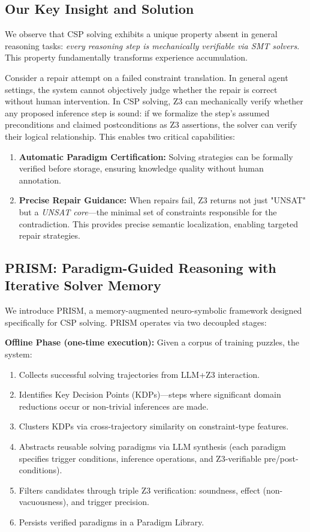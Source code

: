 \subsection{Our Key Insight and Solution}

We observe that CSP solving exhibits a unique property absent in general reasoning tasks: \textit{every reasoning step is mechanically verifiable via SMT solvers}. This property fundamentally transforms experience accumulation.

Consider a repair attempt on a failed constraint translation. In general agent settings, the system cannot objectively judge whether the repair is correct without human intervention. In CSP solving, Z3 can mechanically verify whether any proposed inference step is sound: if we formalize the step's assumed preconditions and claimed postconditions as Z3 assertions, the solver can verify their logical relationship. This enables two critical capabilities:

\begin{enumerate}
    \item \textbf{Automatic Paradigm Certification:} Solving strategies can be formally verified before storage, ensuring knowledge quality without human annotation.
    \item \textbf{Precise Repair Guidance:} When repairs fail, Z3 returns not just "UNSAT" but a \textit{UNSAT core}—the minimal set of constraints responsible for the contradiction. This provides precise semantic localization, enabling targeted repair strategies.
\end{enumerate}

\subsection{PRISM: Paradigm-Guided Reasoning with Iterative Solver Memory}

We introduce PRISM, a memory-augmented neuro-symbolic framework designed specifically for CSP solving. PRISM operates via two decoupled stages:

\textbf{Offline Phase (one-time execution):} Given a corpus of training puzzles, the system:
\begin{enumerate}
    \item Collects successful solving trajectories from LLM+Z3 interaction.
    \item Identifies Key Decision Points (KDPs)—steps where significant domain reductions occur or non-trivial inferences are made.
    \item Clusters KDPs via cross-trajectory similarity on constraint-type features.
    \item Abstracts reusable solving paradigms via LLM synthesis (each paradigm specifies trigger conditions, inference operations, and Z3-verifiable pre/post-conditions).
    \item Filters candidates through triple Z3 verification: soundness, effect (non-vacuousness), and trigger precision.
    \item Persists verified paradigms in a Paradigm Library.
\end{enumerate}

